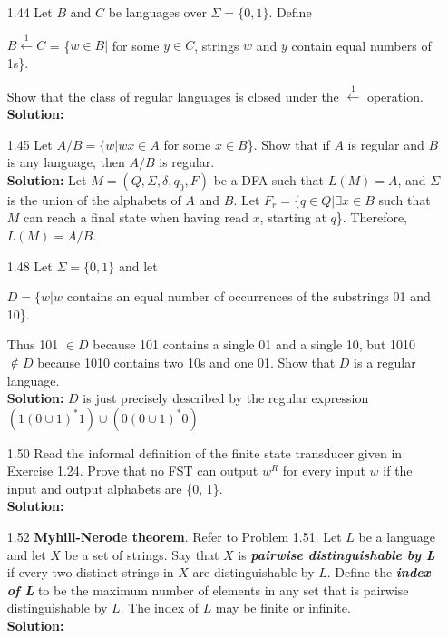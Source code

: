 \begin{enumerate}
\item[1.44]Let $B$ and $C$ be languages over $\Sigma = \{0, 1\}$. Define
\begin{center}
$B \xleftarrow{1} C$ = \{$w \in B |$ for some $y \in C$, strings $w$ and $y$ contain equal numbers of 1s\}. 
\end{center}
Show that the class of regular languages is closed under the $\xleftarrow{1}$ operation.
\\
\textbf{Solution:} \alreadyanswered

\item[1.45]Let $A/B = \{w | wx \in A$ for some $x \in B$\}. Show that if $A$ is regular and $B$ is any language, then $A/B$ is regular.
\\
\textbf{Solution:} Let $M = (Q, \Sigma, \delta, q_0, F)$ be a DFA such that $L(M) = A$, and $\Sigma$ is the union of the alphabets of $A$ and $B$. Let $F_{r} = \{q \in Q | \exists x \in B$ such that $M$ can reach a final state when having read $x$, starting at $q$\}. Therefore, $L(M) = A/B$. 

\item[1.48]Let $\Sigma = \{0, 1\}$ and let
\begin{center}
$D = \{w | w$ contains an equal number of occurrences of the substrings 01 and 10\}.
\end{center}
Thus 101 $\in D$ because 101 contains a single 01 and a single 10, but 1010 $\notin D$ because 1010 contains two 10s and one 01. Show that $D$ is a regular language. 
\\
\textbf{Solution:} $D$ is just precisely described by the regular expression $(1(0 \cup 1)^*1) \cup (0(0 \cup 1)^*0)$

\item[1.50]Read the informal definition of the finite state transducer given in Exercise 1.24. Prove that no FST can output $w^R$ for every input $w$ if the input and output alphabets are \{0, 1\}.
\\
\textbf{Solution:} \alreadyanswered

\item[1.52]\textbf{Myhill-Nerode theorem}. Refer to Problem 1.51. Let $L$ be a language and let $X$ be a set of strings. Say that $X$ is \textbf{\emph{pairwise distinguishable by L}} if every two distinct strings in $X$ are distinguishable by $L$. Define the \textbf{\emph{index of L}} to be the maximum number of elements in any set that is pairwise distinguishable by $L$. The index of $L$ may be finite or infinite.
\\
\textbf{Solution:} \alreadyanswered


\end{enumerate}
